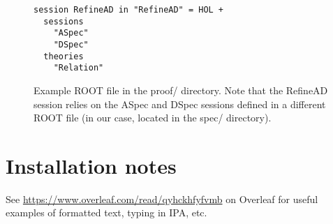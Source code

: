 \documentclass[twoside]{memoir}
\begin{document}
\begin{figure}[htpb]
    \centering
    \begin{lstlisting}[language=isabelle]
session RefineAD in "RefineAD" = HOL +
  sessions
    "ASpec"
    "DSpec"
  theories
    "Relation"
    \end{lstlisting}
    
    \caption{Example ROOT file in the proof/ directory. Note that the RefineAD session relies on the ASpec and DSpec sessions defined in a different ROOT file (in our case, located in the spec/ directory).}
    \label{fig:isabelle-root-file-proof}
\end{figure}


\appendix
\chapter{Installation notes}

See \url{https://www.overleaf.com/read/qyhckhfyfvmb} on Overleaf for useful examples of formatted text, typing in IPA, etc.

\backmatter

\end{document}
